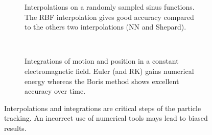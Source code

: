 \begin{figure}[!h]
	\begin{subfigure}[t]{0.5\textwidth}
		
		\caption{Interpolations on a randomly sampled sinus functions. The RBF interpolation gives good accuracy compared to the others two interpolations (NN and Shepard).}
		\label{chap3:interpolation}
	\end{subfigure}
	~
	\begin{subfigure}[t]{0.5\textwidth}
		
		\caption{Integrations of motion and position in a constant electromagnetic field. Euler (and RK) gains numerical energy whereas the Boris method shows excellent accuracy over time.}
		\label{chap3:integration}
	\end{subfigure}
	\caption[Interpolations and integrations are critical steps of the particle tracking]{Interpolations and integrations are critical steps of the particle tracking. An incorrect use of numerical tools mays lead to biased results.}
	\label{chap3:TrackingPitfalls}
\end{figure}
